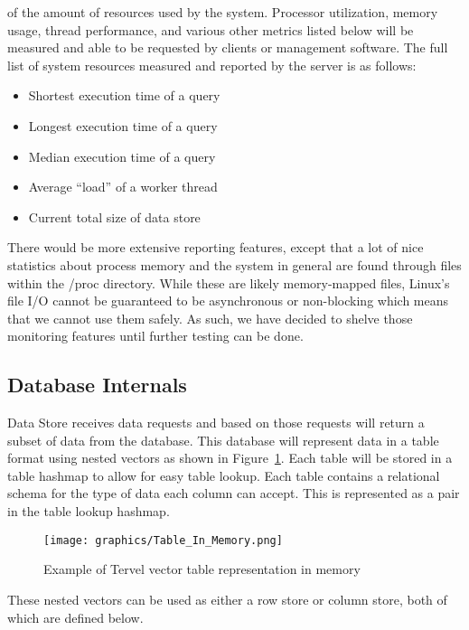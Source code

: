 \documentclass[letterpaper, 11pt]{article}
\begin{document}
of the amount of resources used by the system. Processor utilization, memory usage, thread
performance, and various other metrics listed below will be measured and able to be
requested by clients or management software. The full list of system resources measured
and reported by the server is as follows:
\begin{itemize}
 \item Shortest execution time of a query
 \item Longest execution time of a query
 \item Median execution time of a query
 \item Average ``load'' of a worker thread
 \item Current total size of data store
\end{itemize}

There would be more extensive reporting features, except that a lot of 
nice statistics about process memory and the system in general are found through files within the /proc
directory. While these are likely memory-mapped files, Linux's file I/O cannot be guaranteed to be
asynchronous or non-blocking which means that we cannot use them safely. As such, we have decided
to shelve those monitoring features until further testing can be done.
\par\vspace{\baselineskip}

\subsection{Database Internals}
Data Store receives data requests and based on those requests will return a subset of data from
the database. This database will represent data in a table format using nested vectors as shown
in Figure~\ref{fig:tables_in_memory}. Each table will be stored in a table hashmap to allow for 
easy table lookup. Each table contains a relational schema for the type of data each column 
can accept. This is represented as a pair in the table lookup hashmap.
\par\vspace{\baselineskip}

\begin{figure}
  \centering
  \texttt{[image: graphics/Table\_In\_Memory.png]}
  \caption{Example of Tervel vector table representation in memory}
  \label{fig:tables_in_memory}
\end{figure}

These nested vectors can be used as either a row store or column store, both of which are defined below.
\par\vspace{\baselineskip}
\end{document}
